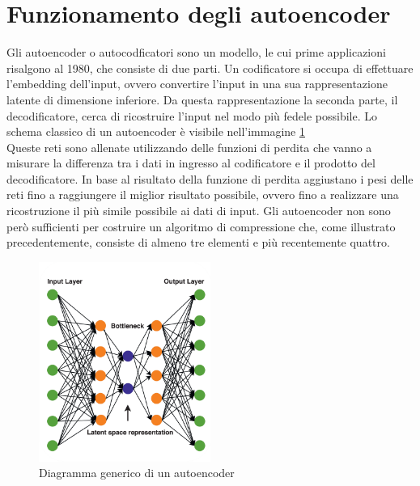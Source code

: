 \section{Funzionamento degli autoencoder}
Gli autoencoder o autocodficatori sono un modello, le cui prime applicazioni risalgono al 1980, che consiste di due parti. Un codificatore si occupa di effettuare l’embedding dell’input, ovvero convertire l’input in una sua rappresentazione latente di dimensione inferiore. Da questa rappresentazione la seconda parte, il decodificatore, cerca di ricostruire l’input nel modo più fedele possibile. Lo schema classico di un autoencoder è visibile nell’immagine \ref{fig:modelloAutoencoder}\\
Queste reti sono allenate utilizzando delle funzioni di perdita che vanno a misurare la differenza tra i dati in ingresso al codificatore e il prodotto del decodificatore. In base al risultato della funzione di perdita aggiustano i pesi delle reti fino a raggiungere il miglior risultato possibile, ovvero fino a realizzare una ricostruzione il più simile possibile ai dati di input.
Gli autoencoder non sono però sufficienti per costruire un algoritmo di compressione che, come illustrato precedentemente, consiste di almeno tre elementi e più recentemente quattro.
\newpage
\begin{figure}[!h]
    \centering
    \includegraphics[width=0.5\textwidth]{Immagini/Autoencoder_scheme.png}
    \caption{Diagramma generico di un autoencoder}
    \label{fig:modelloAutoencoder}
\end{figure}
